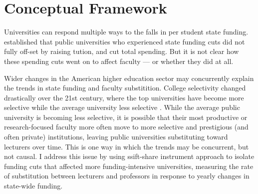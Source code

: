 \section{Conceptual Framework}
\label{sec:conceptual}

Universities can respond multiple ways to the falls in per student state funding.
\cite{NBERw23736} established that public universities who experienced state funding cuts did not fully off-set by raising tution, and cut total spending.
But it is not clear how these spending cuts went on to affect faculty --- or whether they did at all.

Wider changes in the American higher education sector may concurrently explain the trends in state funding and faculty substitition.
College selectivity changed drastically over the 21st century, where the top universities have become more selective while the average university less selective \citep{hoxby2009changing}.
While the average public university is becoming less selective, it is possible that their most productive or research-focused faculty more often move to more selective and prestigious (and often private) institutions, leaving public universities substituting toward lecturers over time.
This is one way in which the trends may be concurrent, but not causal.
I address this issue by using ssift-share instrument approach to isolate funding cuts that affected more funding-intensive universities, measuring the rate of substitution between lecturers and professors in response to yearly changes in state-wide funding.

